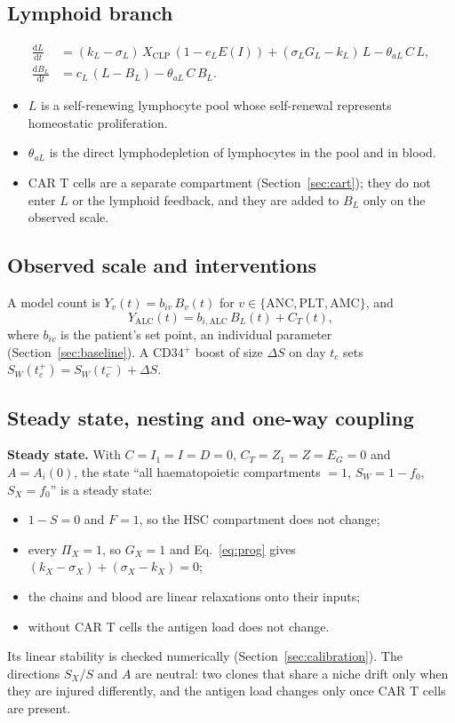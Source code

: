 \documentclass[11pt]{article}
\newcommand{\dd}{\mathrm{d}}
\newcommand{\X}[1]{X_{\mathrm{#1}}}
\begin{document}
\subsection{Lymphoid branch}
\begin{align}
\frac{\dd L}{\dd t} &= (k_L-\sigma_L)\,\X{CLP}\,(1-e_L E(I)) + (\sigma_L G_L - k_L)\,L - \theta_{aL}\,C\,L, \label{eq:ly}\\
\frac{\dd B_L}{\dd t} &= c_L\,(L-B_L) - \theta_{aL}\,C\,B_L. \label{eq:bl}
\end{align}
\begin{itemize}
\item $L$ is a self-renewing lymphocyte pool whose self-renewal represents homeostatic proliferation.
\item $\theta_{aL}$ is the direct lymphodepletion of lymphocytes in the pool and in blood.
\item CAR T cells are a separate compartment (Section~\ref{sec:cart}); they do not enter $L$ or the lymphoid feedback, and they are added to $B_L$ only on the observed scale.
\end{itemize}

\subsection{Observed scale and interventions}
A model count is $Y_v(t)=b_{iv}\,B_v(t)$ for $v\in\{\mathrm{ANC},\mathrm{PLT},\mathrm{AMC}\}$, and
\begin{equation}
Y_{\mathrm{ALC}}(t)=b_{i,\mathrm{ALC}}\,B_L(t)+C_T(t), \label{eq:alc}
\end{equation}
where $b_{iv}$ is the patient's set point, an individual parameter (Section~\ref{sec:baseline}). A CD34$^+$ boost of size $\Delta S$ on day $t_c$ sets $S_W(t_c^+)=S_W(t_c^-)+\Delta S$.

\subsection{Steady state, nesting and one-way coupling}\label{sec:steady}
\textbf{Steady state.} With $C=I_1=I=D=0$, $C_T=Z_1=Z=E_G=0$ and $A=A_i(0)$, the state ``all haematopoietic compartments $=1$, $S_W=1-f_0$, $S_X=f_0$'' is a steady state:
\begin{itemize}
\item $1-S=0$ and $F=1$, so the HSC compartment does not change;
\item every $\Pi_X=1$, so $G_X=1$ and Eq.~\ref{eq:prog} gives $(k_X-\sigma_X)+(\sigma_X-k_X)=0$;
\item the chains and blood are linear relaxations onto their inputs;
\item without CAR T cells the antigen load does not change.
\end{itemize}
Its linear stability is checked numerically (Section~\ref{sec:calibration}). The directions $S_X/S$ and $A$ are neutral: two clones that share a niche drift only when they are injured differently, and the antigen load changes only once CAR T cells are present.
\end{document}
